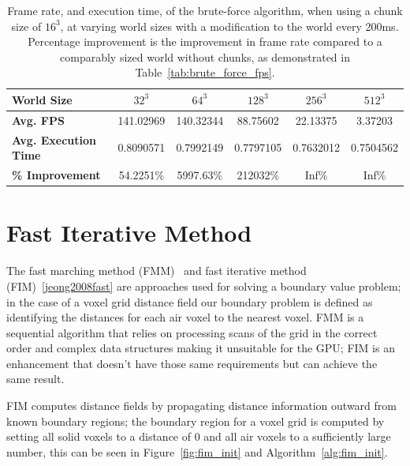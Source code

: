 \begin{table}[h!]
    \centering
    \vspace{0.5em}
    \begin{tabular}{l|*{5}{c}}
        \toprule
        \textbf{World Size}          & \textbf{\(32^3\)} & \textbf{\(64^3\)} & \textbf{\(128^3\)} & \textbf{\(256^3\)} & \textbf{\(512^3\)} \\
        \midrule
        \textbf{Avg. FPS}            & 141.02969         & 140.32344         & 88.75602           & 22.13375           & 3.37203            \\
        \textbf{Avg. Execution Time} & 0.8090571         & 0.7992149         & 0.7797105          & 0.7632012          & 0.7504562          \\
        \textbf{\% Improvement}      & 54.2251\%         & 5997.63\%         & 212032\%           & Inf\%              & Inf\%              \\
        \bottomrule
    \end{tabular}
    \caption{Frame rate, and execution time, of the brute-force algorithm, when using a chunk size of \(16^3\), at
        varying world sizes with a modification to the world every 200ms. Percentage improvement is the improvement in
        frame rate compared to a comparably sized world without chunks, as demonstrated in Table~\ref{tab:brute_force_fps}.}
    \label{tab:chunks_perf}
\end{table}

\FloatBarrier

\section{Fast Iterative Method}
The fast marching method (FMM)~\cite{sethian1999fast} and fast iterative method (FIM)~\ref{jeong2008fast} are
approaches used for solving a boundary value problem; in the case of a voxel grid distance field our boundary problem is
defined as identifying the distances for each air voxel to the nearest voxel. FMM is a sequential algorithm that relies
on processing scans of the grid in the correct order and complex data structures making it unsuitable for the GPU; FIM
is an enhancement that doesn't have those same requirements but can achieve the same result.

FIM computes distance fields by propagating distance information outward from known boundary regions; the boundary
region for a voxel grid is computed by setting all solid voxels to a distance of 0 and all air voxels to a sufficiently
large number, this can be seen in Figure~\ref{fig:fim_init} and Algorithm~\ref{alg:fim_init}.

